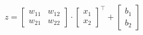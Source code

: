 \documentclass[preview]{standalone}
\begin{document}
\begin{align*}
z = \begin{bmatrix} w_{11} & w_{12} \\ w_{21} & w_{22} \end{bmatrix} \cdot \begin{bmatrix} x_1 \\ x_2 \end{bmatrix}^\top + \begin{bmatrix} b_1 \\ b_2 \end{bmatrix}
\end{align*}
\end{document}
